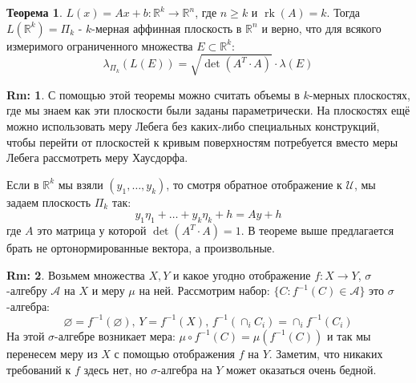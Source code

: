 \documentclass[12pt]{article}
\newcommand{\MR}{\mathbb{R}}
\newcommand{\MU}{\mathcal{U}}
\newcommand{\MA}{\mathcal{A}}
\newcommand{\VN}{\varnothing}
\theoremstyle{definition}
\newtheorem{rem}{Rm:}
\newtheorem{theorem}{Теорема}
\DeclareMathOperator{\rk}{\text{rk}}
\begin{document}
\begin{theorem}
	$L(x) = Ax + b \colon \MR^k \to \MR^n$, где $n \geq k$ и $\rk{(A)} = k$. Тогда $L(\MR^k) = \Pi_k$ - $k$-мерная аффинная плоскость в $\MR^n$ и верно, что для всякого измеримого ограниченного множества $E \subset \MR^k$:
	$$
		\lambda_{\Pi_k}(L(E)) = \sqrt{\det{(A^T{\cdot}A)}}{\cdot}\lambda(E)
	$$
\end{theorem}
\begin{rem}
	С помощью этой теоремы можно считать объемы в $k$-мерных плоскостях, где мы знаем как эти плоскости были заданы параметрически. На плоскостях ещё можно использовать меру Лебега без каких-либо специальных конструкций, чтобы перейти от плоскостей к кривым поверхностям потребуется вместо меры Лебега рассмотреть меру Хаусдорфа.
\end{rem}

Если в $\MR^k$ мы взяли $(y_1,\dotsc, y_k)$, то смотря обратное отображение к $\MU$, мы задаем плоскость $\Pi_k$ так: 
$$
	y_1\eta_1 + \dotsc + y_k \eta_k + h = Ay + h
$$ 
где $A$ это матрица у которой $\det{(A^T{\cdot}A)} = 1$. В теореме выше предлагается брать не ортонормированные вектора, а произвольные.

\begin{rem}
	Возьмем множества $X, Y$ и какое угодно отображение $f \colon X \to Y$, $\sigma$-алгебру $\MA$ на $X$ и меру $\mu$ на ней. Рассмотрим набор: $\{C \colon f^{-1}(C) \in \MA\}$ это $\sigma$-алгебра:
	$$
		\VN = f^{-1}(\VN), \, Y = f^{-1}(X), \, f^{-1}(\cap_i C_i) = \cap_i f^{-1}(C_i)
	$$
	На этой $\sigma$-алгебре возникает мера: $\mu \circ f^{-1}(C) = \mu(f^{-1}(C))$ и так мы перенесем меру из $X$ с помощью отображения $f$ на $Y$. Заметим, что никаких требований к $f$ здесь нет, но $\sigma$-алгебра на $Y$ может оказаться очень бедной.
\end{rem}
\end{document}
